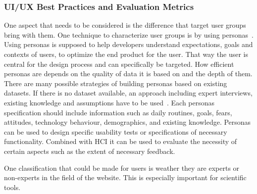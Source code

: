 \subsubsection*{UI/UX Best Practices and Evaluation Metrics}


One aspect that needs to be considered is the difference that target user groups bring with them. One technique to characterize user groups is by using personas~\cite{billestrup_persona_2014}. Using personas is supposed to help developers understand expectations, goals and contexts of users, to optimize the end product for the user.
That way the user is central for the design process and can specifically be targeted. How efficient personas are depends on the quality of data it is based on and the depth of them.
There are many possible strategies of building personas based on existing datasets. If there is no dataset available, an approach including expert interviews, existing knowledge and assumptions have to be used~\cite{pruitt_personas_2003}. 
Each personas specification should include information such as daily routines, goals, fears, attitudes, technology behaviour, demographics, and existing knowledge.
Personas can be used to design specific usability tests or specifications of necessary functionality. 
Combined with \ac{HCI} it can be used to evaluate the necessity of certain aspects such as the extent of necessary feedback.

One classification that could be made for users is weather they are experts or non-experts in the field of the website. This is especially important for scientific tools.








